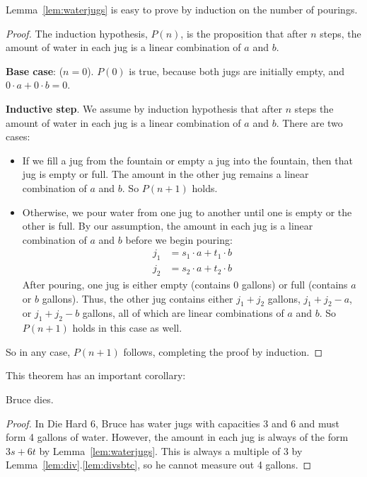 Lemma~\ref{lem:waterjugs} is easy to prove by induction on the number of
pourings.

\begin{proof}
The induction hypothesis, $P(n)$, is the proposition that after $n$
steps, the amount of water in each jug is a linear combination of $a$
and $b$.

\noindent \textbf{Base case}: ($n = 0$).  $P(0)$ is true, because both jugs are
initially empty, and $0 \cdot a + 0 \cdot b = 0$.

\noindent \textbf{Inductive step}.  We assume by induction hypothesis that
after $n$ steps the amount of water in each jug is a linear combination of
$a$ and $b$.  There are two cases:
%
\begin{itemize}
%
\item If we fill a jug from the fountain or empty a jug into the
fountain, then that jug is empty or full.  The amount in the other jug
remains a linear combination of $a$ and $b$.  So $P(n+1)$ holds.

\item Otherwise, we pour water from one jug to another until one is
empty or the other is full.  By our assumption, the amount in each jug
is a linear combination of $a$ and $b$ before we begin pouring:
%
\begin{align*}
j_1 & = s_1 \cdot a + t_1 \cdot b \\
j_2 & = s_2 \cdot a + t_2 \cdot b
\end{align*}
%
After pouring, one jug is either empty (contains 0 gallons) or full
(contains $a$ or $b$ gallons).  Thus, the other jug contains either
$j_1 + j_2$ gallons, $j_1 + j_2 - a$, or $j_1 + j_2 - b$ gallons, all
of which are linear combinations of $a$ and $b$.  So $P(n+1)$ holds in
this case as well.
\end{itemize}
%
So in any case,  $P(n+1)$ follows, completing the proof by induction.
\end{proof}

This theorem has an important corollary:
\begin{corollary}
Bruce dies.
\end{corollary}

\begin{proof}
In Die Hard 6, Bruce has water jugs with capacities 3 and 6 and must
form 4 gallons of water.  However, the amount in each jug is always of
the form $3s + 6t$ by Lemma~\ref{lem:waterjugs}.  This is always a
multiple of 3 by Lemma~\ref{lem:div}.\ref{lem:divsbtc}, so he cannot
measure out 4 gallons.
\end{proof}

